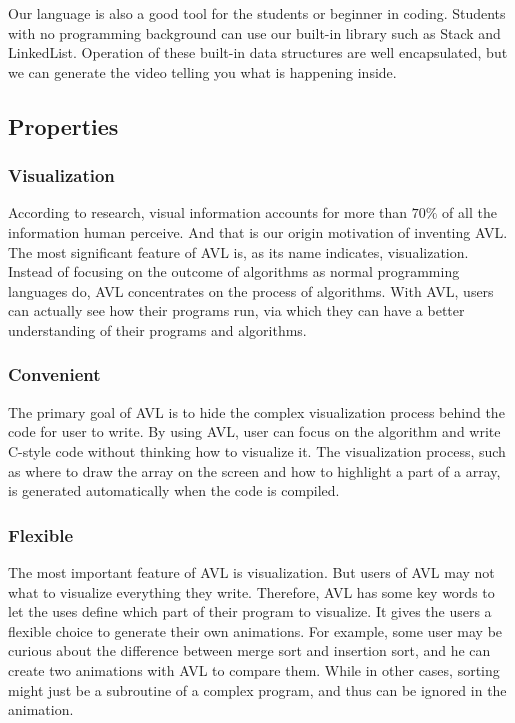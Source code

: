 Our language is also a good tool for the students or beginner in coding. Students with no
programming background can use our built-in library such as Stack and LinkedList. Operation of these
built-in data structures are well encapsulated, but we can generate the video telling you what is
happening inside.
				 
				  
\subsection{Properties}
				   
\subsubsection{Visualization}

According to research, visual information accounts for more than $70\%$ of all the information human
perceive. And that is our origin motivation of inventing AVL. The most significant feature of AVL
is, as its name indicates, visualization. Instead of focusing on the outcome of algorithms as normal
programming languages do, AVL concentrates on the process of algorithms. With AVL, users can
actually see how their programs run, via which they can have a better understanding of their
programs and algorithms.
				    
\subsubsection{Convenient}

The primary goal of AVL is to hide the complex visualization process behind the code for user to
write. By using AVL, user can focus on the algorithm and write C-style code without thinking how to
visualize it. The visualization process, such as where to draw the array on the screen and how to
highlight a part of a array, is generated automatically when the code is compiled.
					 
\subsubsection{Flexible}

The most important feature of AVL is visualization. But users of AVL may not what to visualize
everything they write. Therefore, AVL has some key words to let the uses define which part of their
program to visualize. It gives the users a flexible choice to generate their own animations. For
example, some user may be curious about the difference between merge sort and insertion sort, and he
can create two animations with AVL to compare them. While in other cases, sorting might just be a
subroutine of a complex program, and thus can be ignored in the animation.
					  
